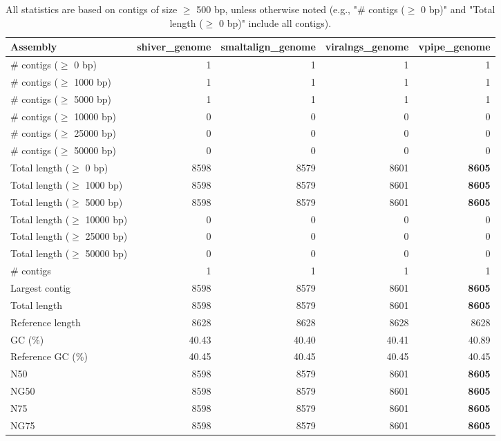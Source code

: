 \documentclass[12pt,a4paper]{article}
\begin{document}
\begin{table}[ht]
\begin{center}
\caption{All statistics are based on contigs of size $\geq$ 500 bp, unless otherwise noted (e.g., "\# contigs ($\geq$ 0 bp)" and "Total length ($\geq$ 0 bp)" include all contigs).}
\begin{tabular}{|l*{4}{|r}|}
\hline
Assembly & shiver\_genome & smaltalign\_genome & viralngs\_genome & vpipe\_genome \\ \hline
\# contigs ($\geq$ 0 bp) & 1 & 1 & 1 & 1 \\ \hline
\# contigs ($\geq$ 1000 bp) & 1 & 1 & 1 & 1 \\ \hline
\# contigs ($\geq$ 5000 bp) & 1 & 1 & 1 & 1 \\ \hline
\# contigs ($\geq$ 10000 bp) & 0 & 0 & 0 & 0 \\ \hline
\# contigs ($\geq$ 25000 bp) & 0 & 0 & 0 & 0 \\ \hline
\# contigs ($\geq$ 50000 bp) & 0 & 0 & 0 & 0 \\ \hline
Total length ($\geq$ 0 bp) & 8598 & 8579 & 8601 & {\bf 8605} \\ \hline
Total length ($\geq$ 1000 bp) & 8598 & 8579 & 8601 & {\bf 8605} \\ \hline
Total length ($\geq$ 5000 bp) & 8598 & 8579 & 8601 & {\bf 8605} \\ \hline
Total length ($\geq$ 10000 bp) & 0 & 0 & 0 & 0 \\ \hline
Total length ($\geq$ 25000 bp) & 0 & 0 & 0 & 0 \\ \hline
Total length ($\geq$ 50000 bp) & 0 & 0 & 0 & 0 \\ \hline
\# contigs & 1 & 1 & 1 & 1 \\ \hline
Largest contig & 8598 & 8579 & 8601 & {\bf 8605} \\ \hline
Total length & 8598 & 8579 & 8601 & {\bf 8605} \\ \hline
Reference length & 8628 & 8628 & 8628 & 8628 \\ \hline
GC (\%) & 40.43 & 40.40 & 40.41 & 40.89 \\ \hline
Reference GC (\%) & 40.45 & 40.45 & 40.45 & 40.45 \\ \hline
N50 & 8598 & 8579 & 8601 & {\bf 8605} \\ \hline
NG50 & 8598 & 8579 & 8601 & {\bf 8605} \\ \hline
N75 & 8598 & 8579 & 8601 & {\bf 8605} \\ \hline
NG75 & 8598 & 8579 & 8601 & {\bf 8605} \\ \hline

\end{tabular}
\end{center}
\end{table}
\end{document}
